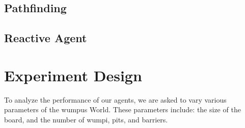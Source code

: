 \documentclass{article}
\begin{document}
			\subsection{Pathfinding}
			
		\subsection{Reactive Agent}
			
		
		
	\section{Experiment Design}
	
	To analyze the performance of our agents, we are asked to vary various parameters of the wumpus World. These parameters include: the size of the board, and the number of wumpi, pits, and barriers. 
	
	
	

	




		
	
\end{document}
